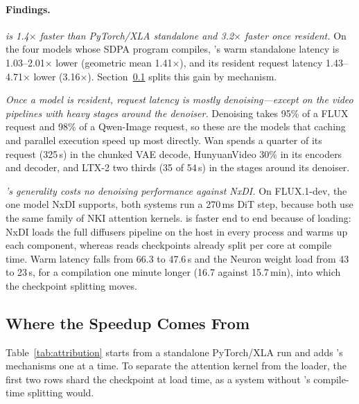 \paragraph{Findings.}
\emph{\name is 1.4$\times$ faster than PyTorch/XLA standalone and 3.2$\times$ faster once resident.} On the four models whose SDPA program compiles, \name's warm standalone latency is 1.03--2.01$\times$ lower (geometric mean 1.41$\times$), and its resident request latency 1.43--4.71$\times$ lower (3.16$\times$). Section~\ref{sec:eval-attribution} splits this gain by mechanism.

\emph{Once a model is resident, request latency is mostly denoising---except on the video pipelines with heavy stages around the denoiser.} Denoising takes 95\% of a FLUX request and 98\% of a Qwen-Image request, so these are the models that caching and parallel execution speed up most directly. Wan spends a quarter of its request (325\,s) in the chunked VAE decode, HunyuanVideo 30\% in its encoders and decoder, and LTX-2 two thirds (35 of 54\,s) in the stages around its denoiser.

\emph{\name's generality costs no denoising performance against NxDI.} On FLUX.1-dev, the one model NxDI supports, both systems run a 270\,ms DiT step, because both use the same family of NKI attention kernels. \name is faster end to end because of loading: NxDI loads the full diffusers pipeline on the host in every process and warms up each component, whereas \name reads checkpoints already split per core at compile time. Warm latency falls from 66.3 to 47.6\,s and the Neuron weight load from 43 to 23\,s, for a compilation one minute longer (16.7 against 15.7\,min), into which the checkpoint splitting moves.

\subsection{Where the Speedup Comes From}
\label{sec:eval-attribution}

Table~\ref{tab:attribution} starts from a standalone PyTorch/XLA run and adds \name's mechanisms one at a time. To separate the attention kernel from the loader, the first two rows shard the checkpoint at load time, as a system without \name's compile-time splitting would.

